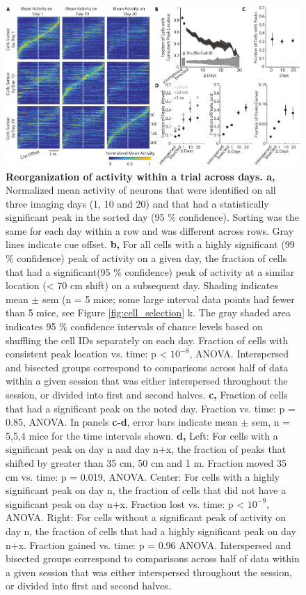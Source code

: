 \begin{figure}
\includegraphics[width=\textwidth]{figures/2_all.pdf}
\caption[Reorganization of activity within a trial across days.]{\textbf{Reorganization of activity within a trial across days. a,} Normalized mean activity of neurons that were identified on all three imaging days (1, 10 and 20) and that had a statistically significant peak in the sorted day (95 $\%$ confidence). Sorting was the same for each day within a row and was different across rows. Gray lines indicate cue offset.
%
\textbf{b,} For all cells with a highly significant (99 $\%$ confidence) peak of activity on a given day, the fraction of cells that had a significant(95 $\%$ confidence) peak of activity at a similar location (< 70 cm shift) on a subsequent day. Shading indicates mean $\pm$ sem (n = 5 mice; some large interval data points had fewer than 5 mice, see Figure \ref{fig:cell_selection} k. The gray shaded area indicates 95 $\%$ confidence intervals of chance levels based on shuffling the cell IDs separately on each day. Fraction of cells with consistent peak location vs. time: p < $10^{-8}$, ANOVA. Interspersed and bisected groups correspond to comparisons across half of data within a given session that was either interspersed throughout the session, or divided into first and second halves.
%
\textbf{c,} Fraction of cells that had a significant peak on the noted day.  Fraction vs. time: p =  0.85, ANOVA. In panels \textbf{c-d}, error bars indicate mean $\pm$ sem, n = 5,5,4 mice for the time intervals shown.
%
\textbf{d,} Left: For cells with a significant peak on day n and day n+x, the fraction of peaks that shifted by greater than 35 cm, 50 cm and 1 m. Fraction moved 35 cm vs. time: p = 0.019, ANOVA. Center: For cells with a highly significant peak on day n, the fraction of cells that did not have a significant peak on day n+x. Fraction lost vs. time: p < $10^{-9}$, ANOVA. Right: For cells without a significant peak of activity on day n, the fraction of cells that had a highly significant peak on day n+x.  Fraction gained vs. time: p = 0.96 ANOVA.  Interspersed and bisected groups correspond to comparisons across half of data within a given session that was either interspersed throughout the session, or divided into first and second halves.
\label{fig:2_all}}
\end{figure}

